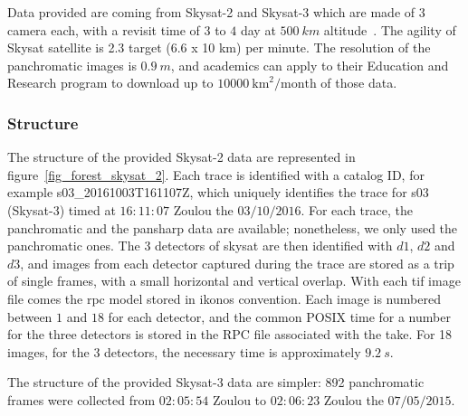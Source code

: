 \documentclass[paper=a4, fontsize=11pt, onecolumn, tikz, dvipsnames, svgnames, x11names]{article}
\begin{document}
Data provided are coming from Skysat-2 and Skysat-3 which are made of 3 camera each, with a revisit time of $3$ to $4$ day at $500~km$ altitude~\cite{planet_product}. The agility of Skysat satellite is 2.3 target (6.6 x 10 km) per minute. The resolution of the panchromatic images is $0.9~m$, and academics can apply to their Education and Research program to download up to $10000~\text{km}^2/\text{month}$ of those data.

\subsubsection{Structure}

The structure of the provided Skysat-2 data are represented in figure~\ref{fig_forest_skysat_2}. Each trace is identified with a catalog ID, for example s03\_20161003T161107Z, which uniquely identifies the trace for s03 (Skysat-3) timed at $16:11:07$ Zoulou the $03/10/2016$. For each trace, the panchromatic and the pansharp data are available; nonetheless, we only used the panchromatic ones. The 3 detectors of skysat are then identified with $d1$, $d2$ and $d3$, and images from each detector captured during the trace are stored as a trip of single frames, with a small horizontal and vertical overlap. With each tif image file comes the rpc model stored in ikonos convention. Each image is numbered between $1$ and $18$ for each detector, and the common POSIX time for a number for the three detectors is stored in the RPC file associated with the take. For 18 images, for the 3 detectors, the necessary time is approximately $9.2~s$.

The structure of the provided Skysat-3 data are simpler: 892 panchromatic frames were collected from $02:05:54$ Zoulou to $02:06:23$ Zoulou the $07/05/2015$.
\end{document}
